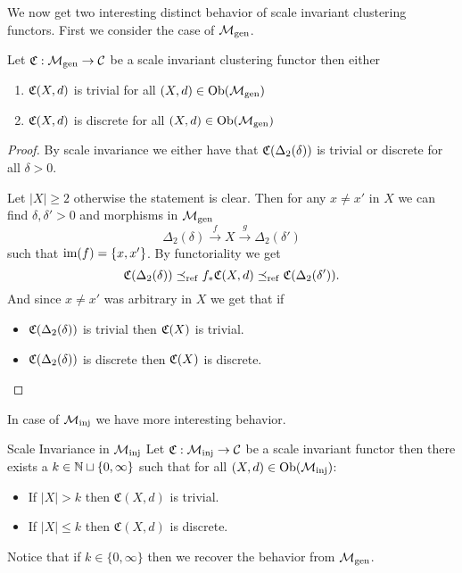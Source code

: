 We now get two interesting distinct behavior of scale invariant clustering functors. First we consider the case of ${\mathcal{M}_\mathrm{gen}}$.

\begin{proposition}{}{}
    Let $\mathfrak{C}: {\mathcal{M}_\mathrm{gen}} \to \mathcal{C}$ be a scale invariant clustering functor then either
    \begin{enumerate}
        \item $\mathfrak{C}(X,d)$ is trivial for all $(X,d) \in \mathrm {Ob}({\mathcal{M}_\mathrm{gen}})$
        \item $\mathfrak{C}(X,d)$ is discrete for all $(X,d) \in \mathrm {Ob}({\mathcal{M}_\mathrm{gen}})$
    \end{enumerate}
\end{proposition}

\begin{proof}
    \source[]
    By scale invariance we either have that $\mathfrak{C}(\Delta_2(\delta))$ is trivial or discrete for all $\delta > 0$.

    Let $|X| \ge 2$ otherwise the statement is clear. Then for any $x \neq x'$ in $X$ we can find $\delta, \delta' > 0$ and morphisms in ${\mathcal{M}_\mathrm{gen}}$
    $$
    \Delta_2(\delta) \overset{f}\longrightarrow X \overset{g}\longrightarrow \Delta_2(\delta')
    $$
    such that $\operatorname*{im}(f) = \{x, x'\}$. By functoriality we get
    $$
    \mathfrak{C}(\Delta_2(\delta)) \preceq_\mathrm{ref} f_*\mathfrak{C}(X,d) \preceq_\mathrm{ref} \mathfrak{C}(\Delta_2(\delta')).
    $$
    And since $x \neq x'$ was arbitrary in $X$ we get that if
    \begin{itemize}
        \item $\mathfrak{C}(\Delta_2(\delta))$ is trivial then $\mathfrak{C}(X)$ is trivial.
        \item $\mathfrak{C}(\Delta_2(\delta))$ is discrete then $\mathfrak{C}(X)$ is discrete.
    \end{itemize}
\end{proof}

In case of ${\mathcal{M}_\mathrm{inj}}$ we have more interesting behavior.

\begin{proposition}{Scale Invariance in ${\mathcal{M}_\mathrm{inj}}$}{}
    Let $\mathfrak{C}: {\mathcal{M}_\mathrm{inj}} \to \mathcal{C}$ be a scale invariant functor then there exists a $k \in \mathbb N \sqcup \{0, \infty\}$ such that for all $(X,d) \in \mathrm {Ob}({\mathcal{M}_\mathrm{inj}})$:

    \begin{itemize}
        \item If $|X| > k$ then $\mathfrak{C}(X,d)$ is trivial.
        \item If $|X| \le k$ then $\mathfrak{C}(X,d)$ is discrete.
    \end{itemize}

    Notice that if $k \in \{0, \infty\}$ then we recover the behavior from ${\mathcal{M}_\mathrm{gen}}$.
\end{proposition}

